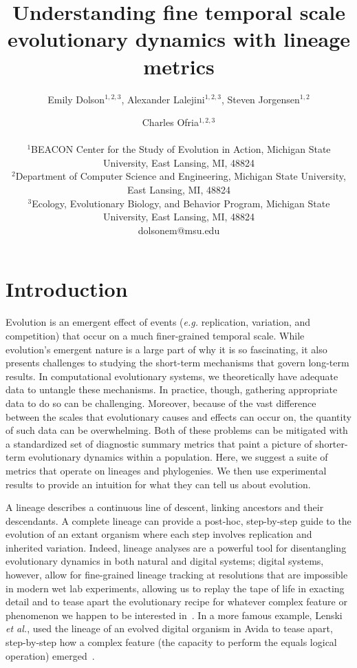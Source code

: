 \documentclass[letterpaper]{article}
\title{Understanding fine temporal scale evolutionary dynamics with lineage metrics}
\author{Emily Dolson$^{1,2,3}$, Alexander Lalejini$^{1,2, 3}$, Steven Jorgensen$^{1,2}$ \and Charles Ofria$^{1,2, 3}$ \\
\mbox{}\\
$^1$BEACON Center for the Study of Evolution in Action, Michigan State University, East Lansing, MI, 48824 \\
$^2$Department of Computer Science and Engineering, Michigan State University, East Lansing, MI, 48824 \\
$^3$Ecology, Evolutionary Biology, and Behavior Program, Michigan State University, East Lansing, MI, 48824 \\
dolsonem@msu.edu} %
\begin{document}
\maketitle

\begin{abstract}

\end{abstract}

\section{Introduction}

Evolution is an emergent effect of events (\textit{e.g.} replication, variation, and competition) that occur on a much finer-grained temporal scale. While evolution's emergent nature is a large part of why it is so fascinating, it also presents challenges to studying the short-term mechanisms that govern long-term results. In computational evolutionary systems, we theoretically have adequate data to untangle these mechanisms. In practice, though, gathering appropriate data to do so can be challenging. Moreover, because of the vast difference between the scales that evolutionary causes and effects can occur on, the quantity of such data can be overwhelming. Both of these problems can be mitigated with a standardized set of diagnostic summary metrics that paint a picture of shorter-term evolutionary dynamics within a population. Here, we suggest a suite of metrics that operate on lineages and phylogenies. We then use experimental results to provide an intuition for what they can tell us about evolution.

A lineage describes a continuous line of descent, linking ancestors and their descendants. A complete lineage can provide a post-hoc, step-by-step guide to the evolution of an extant organism where each step involves replication and inherited variation. Indeed, lineage analyses are a powerful tool for disentangling evolutionary dynamics in both natural and digital systems; digital systems, however, allow for fine-grained lineage tracking at resolutions that are impossible in modern wet lab experiments, allowing us to replay the tape of life in exacting detail and to tease apart the evolutionary recipe for whatever complex feature or phenomenon we happen to be interested in~\citep{mcphee_using_2016}. 
In a more famous example, Lenski \textit{et al.}, used the lineage of an evolved digital organism in Avida to tease apart, step-by-step how a complex feature (the capacity to perform the equals logical operation) emerged~\citep{lenski_evolutionary_2003}. 
\end{document}
